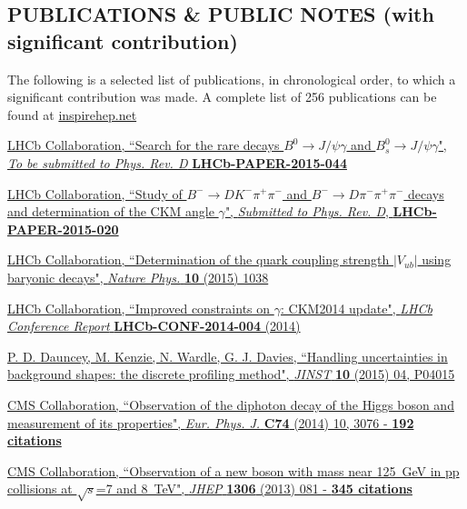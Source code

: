 \documentclass[margin, 10pt]{res} %
\begin{document}
\begin{resume}
\section{PUBLICATIONS \& PUBLIC NOTES \newline(with significant contribution)}
The following is a selected list of publications, in chronological order, to which a significant contribution was made. A complete list of 256 publications
can be found at \href{https://inspirehep.net/search?ln=en&ln=en&p=Matthew+Kenzie&of=hb&action_search=Search&sf=earliestdate&so=d&rm=&rg=25&sc=0}{inspirehep.net}

\href{}{LHCb Collaboration, ``Search for the rare decays $B^{0}\rightarrow J/\psi\gamma$ and $B^{0}_{s}\rightarrow J/\psi\gamma$",
\textit{To be submitted to Phys. Rev. D}
\textbf{LHCb-PAPER-2015-044}
}

\href{http://inspirehep.net/record/1373302}{LHCb Collaboration, ``Study of $B^{-}\rightarrow DK^{-}\pi^{+}\pi^{-}$ and $B^{-}\rightarrow D\pi^{-}\pi^{+}\pi^{-}$ decays and determination of the CKM angle $\gamma$",
\textit{Submitted to Phys. Rev. D},
\textbf{LHCb-PAPER-2015-020}
}

\href{http://inspirehep.net/record/1358215}{LHCb Collaboration, ``Determination of the quark coupling strength $|V_{ub}|$ using baryonic decays",
\textit{Nature Phys.}
\textbf{10} (2015) 1038
}

\href{http://inspirehep.net/record/1388239}{LHCb Collaboration, ``Improved constraints on $\gamma$: CKM2014 update",
\textit{LHCb Conference Report}
\textbf{LHCb-CONF-2014-004} (2014)
}

\href{http://inspirehep.net/record/1312971}{P. D. Dauncey, M. Kenzie, N. Wardle, G. J. Davies, ``Handling uncertainties in background shapes: the discrete profiling method",
\textit{JINST}
\textbf{10} (2015) 04, P04015
}

\href{http://inspirehep.net/record/1304454}{CMS Collaboration, ``Observation of the diphoton decay of the Higgs boson and measurement of its properties",
\textit{Eur. Phys. J.}
\textbf{C74} (2014) 10, 3076 - \textbf{192 citations}
}

\href{http://inspirehep.net/record/1224273}{CMS Collaboration, ``Observation of a new boson with mass near 125~GeV in pp collisions at $\sqrt{s}$=7 and 8~TeV",
\textit{JHEP}
\textbf{1306} (2013) 081 - \textbf{345 citations}
}


\end{resume}
\end{document}
